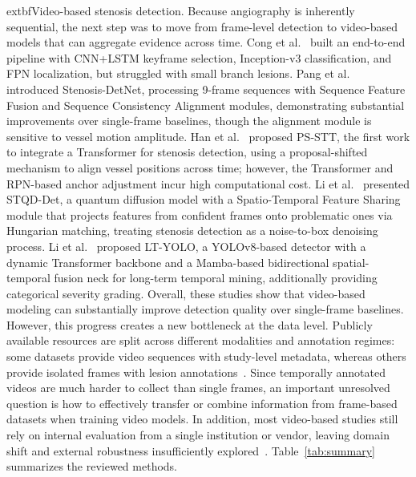 \documentclass{article}
\begin{document}
	extbf{Video-based stenosis detection.} Because angiography is inherently sequential, the next step was to move from frame-level detection to video-based models that can aggregate evidence across time. Cong et al.~\cite{fvcm} built an end-to-end pipeline with CNN+LSTM keyframe selection, Inception-v3 classification, and FPN localization, but struggled with small branch lesions. Pang et al.~\cite{PANG2021101900} introduced Stenosis-DetNet, processing 9-frame sequences with Sequence Feature Fusion and Sequence Consistency Alignment modules, demonstrating substantial improvements over single-frame baselines, though the alignment module is sensitive to vessel motion amplitude. Han et al.~\cite{HAN2023106546} proposed PS-STT, the first work to integrate a Transformer for stenosis detection, using a proposal-shifted mechanism to align vessel positions across time; however, the Transformer and RPN-based anchor adjustment incur high computational cost. Li et al.~\cite{STQD-Det} presented STQD-Det, a quantum diffusion model with a Spatio-Temporal Feature Sharing module that projects features from confident frames onto problematic ones via Hungarian matching, treating stenosis detection as a noise-to-box denoising process. Li et al.~\cite{li2025ltyolo} proposed LT-YOLO, a YOLOv8-based detector with a dynamic Transformer backbone and a Mamba-based bidirectional spatial-temporal fusion neck for long-term temporal mining, additionally providing categorical severity grading. Overall, these studies show that video-based modeling can substantially improve detection quality over single-frame baselines. However, this progress creates a new bottleneck at the data level. Publicly available resources are split across different modalities and annotation regimes: some datasets provide video sequences with study-level metadata, whereas others provide isolated frames with lesion annotations~\cite{jimenezpartinen2024cadica, popov2024arcade}. Since temporally annotated videos are much harder to collect than single frames, an important unresolved question is how to effectively transfer or combine information from frame-based datasets when training video models. In addition, most video-based studies still rely on internal evaluation from a single institution or vendor, leaving domain shift and external robustness insufficiently explored~\cite{cardiovascular}. Table~\ref{tab:summary} summarizes the reviewed methods.
\end{document}
